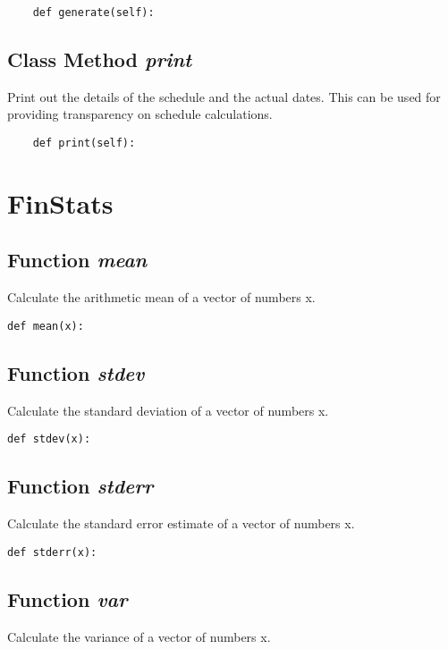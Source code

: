 \documentclass[twoside,11pt]{book}
\begin{document}
\begin{lstlisting}
    def generate(self):
\end{lstlisting}

\subsection{Class Method {\it print}}
Print out the details of the schedule and the actual dates. This can be used for providing transparency on schedule calculations. 

\begin{lstlisting}
    def print(self):
\end{lstlisting}

\newpage
\section{FinStats}

\subsection{Function {\it mean}}
Calculate the arithmetic mean of a vector of numbers x. 

\begin{lstlisting}
def mean(x):
\end{lstlisting}

\subsection{Function {\it stdev}}
Calculate the standard deviation of a vector of numbers x. 

\begin{lstlisting}
def stdev(x):
\end{lstlisting}

\subsection{Function {\it stderr}}
Calculate the standard error estimate of a vector of numbers x. 

\begin{lstlisting}
def stderr(x):
\end{lstlisting}

\subsection{Function {\it var}}
Calculate the variance of a vector of numbers x. 
\end{document}
